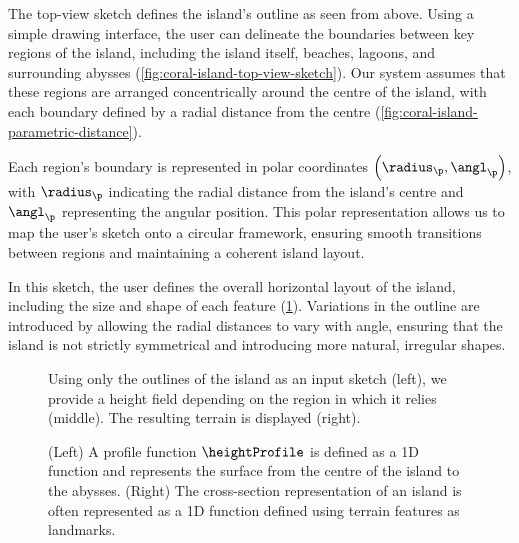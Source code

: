The top-view sketch defines the island's outline as seen from above. Using a simple drawing interface, the user can delineate the boundaries between key regions of the island, including the island itself, beaches, lagoons, and surrounding abysses (\cref{fig:coral-island-top-view-sketch}). Our system assumes that these regions are arranged concentrically around the centre of the island, with each boundary defined by a radial distance from the centre (\cref{fig:coral-island-parametric-distance}).

Each region's boundary is represented in polar coordinates $\left(\radius_\p, \angl_\p\right)$, with $\radius_\p$ indicating the radial distance from the island's centre and $\angl_\p$ representing the angular position. This polar representation allows us to map the user's sketch onto a circular framework, ensuring smooth transitions between regions and maintaining a coherent island layout.

In this sketch, the user defines the overall horizontal layout of the island, including the size and shape of each feature (\cref{fig:coral-island-procedural-height-only}). Variations in the outline are introduced by allowing the radial distances to vary with angle, ensuring that the island is not strictly symmetrical and introducing more natural, irregular shapes.

\begin{figure}[H]
    \caption[Curve-based island generation using only outlines]{Using only the outlines of the island as an input sketch (left), we provide a height field depending on the region in which it relies (middle). The resulting terrain is displayed (right). }
    \label{fig:coral-island-procedural-height-only}
\end{figure}

\begin{figure}
    \caption[Our profile function inspired by the typical cross-section representation of islands' reefs]{(Left) A profile function $\heightProfile$ is defined as a 1D function and represents the surface from the centre of the island to the abysses. (Right) The cross-section representation of an island is often represented as a 1D function defined using terrain features as landmarks.}
    \label{fig:coral-island-profile-function}
\end{figure}

